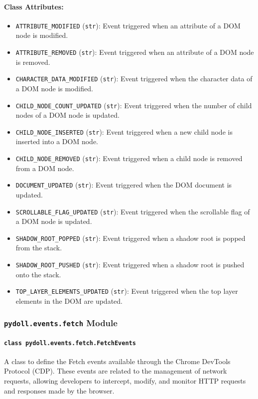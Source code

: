 \documentclass{article}
\begin{document}
\paragraph{Class Attributes:}
\begin{itemize}
    \item \texttt{ATTRIBUTE\_MODIFIED} (\texttt{str}): Event triggered when an attribute of a DOM node is modified.
    \item \texttt{ATTRIBUTE\_REMOVED} (\texttt{str}): Event triggered when an attribute of a DOM node is removed.
    \item \texttt{CHARACTER\_DATA\_MODIFIED} (\texttt{str}): Event triggered when the character data of a DOM node is modified.
    \item \texttt{CHILD\_NODE\_COUNT\_UPDATED} (\texttt{str}): Event triggered when the number of child nodes of a DOM node is updated.
    \item \texttt{CHILD\_NODE\_INSERTED} (\texttt{str}): Event triggered when a new child node is inserted into a DOM node.
    \item \texttt{CHILD\_NODE\_REMOVED} (\texttt{str}): Event triggered when a child node is removed from a DOM node.
    \item \texttt{DOCUMENT\_UPDATED} (\texttt{str}): Event triggered when the DOM document is updated.
    \item \texttt{SCROLLABLE\_FLAG\_UPDATED} (\texttt{str}): Event triggered when the scrollable flag of a DOM node is updated.
    \item \texttt{SHADOW\_ROOT\_POPPED} (\texttt{str}): Event triggered when a shadow root is popped from the stack.
    \item \texttt{SHADOW\_ROOT\_PUSHED} (\texttt{str}): Event triggered when a shadow root is pushed onto the stack.
    \item \texttt{TOP\_LAYER\_ELEMENTS\_UPDATED} (\texttt{str}): Event triggered when the top layer elements in the DOM are updated.
\end{itemize}

\subsubsection*{\texttt{pydoll.events.fetch} Module}

\paragraph*{\texttt{class pydoll.events.fetch.FetchEvents}}
\noindent A class to define the Fetch events available through the Chrome DevTools Protocol (CDP). These events are related to the management of network requests, allowing developers to intercept, modify, and monitor HTTP requests and responses made by the browser.
\end{document}
